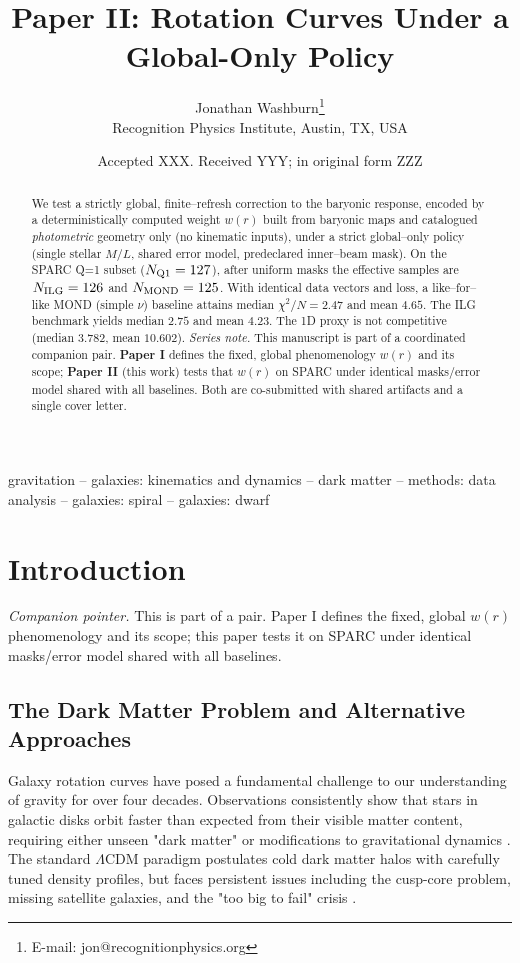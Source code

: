 \documentclass[usenatbib]{mnras}
\title[Rotation Curves Under a Global-Only Policy]{Paper II: Rotation Curves Under a Global-Only Policy}
\author[J. Washburn]{Jonathan Washburn\thanks{E-mail: jon@recognitionphysics.org}\\
Recognition Physics Institute, Austin, TX, USA
}
\date{Accepted XXX. Received YYY; in original form ZZZ}
\begin{document}
\maketitle

\begin{abstract}
We test a strictly global, finite–refresh correction to the baryonic response, encoded by a deterministically computed weight $w(r)$ built from baryonic maps and catalogued \emph{photometric} geometry only (no kinematic inputs), under a strict global–only policy (single stellar $M/L$, shared error model, predeclared inner–beam mask). On the SPARC Q=1 subset ($N_{\rm Q1}=127$), after uniform masks the effective samples are $N_{\rm ILG}=126$ and $N_{\rm MOND}=125$. With identical data vectors and loss, a like–for–like MOND (simple $\nu$) baseline attains median $\chi^2/N=\mathbf{2.47}$ and mean $\mathbf{4.65}$. The ILG benchmark yields median $\mathbf{2.75}$ and mean $\mathbf{4.23}$. The 1D proxy is not competitive (median $\mathbf{3.782}$, mean $\mathbf{10.602}$).
\vspace{0.5em}
\noindent\textit{Series note.} This manuscript is part of a coordinated companion pair. \textbf{Paper I} defines the fixed, global phenomenology $w(r)$ and its scope; \textbf{Paper II} (this work) tests that $w(r)$ on SPARC under identical masks/error model shared with all baselines. Both are co-submitted with shared artifacts and a single cover letter.
\end{abstract}

\begin{keywords}
gravitation -- galaxies: kinematics and dynamics -- dark matter -- methods: data analysis -- galaxies: spiral -- galaxies: dwarf
\end{keywords}

\section{Introduction}
\noindent\textit{Companion pointer.} This is part of a pair. Paper I defines the fixed, global $w(r)$ phenomenology and its scope; this paper tests it on SPARC under identical masks/error model shared with all baselines.

\subsection{The Dark Matter Problem and Alternative Approaches}

Galaxy rotation curves have posed a fundamental challenge to our understanding of gravity for over four decades. Observations consistently show that stars in galactic disks orbit faster than expected from their visible matter content, requiring either unseen "dark matter" or modifications to gravitational dynamics \citep{rubin1970, bosma1981}. The standard $\Lambda$CDM paradigm postulates cold dark matter halos with carefully tuned density profiles, but faces persistent issues including the cusp-core problem, missing satellite galaxies, and the "too big to fail" crisis \citep{bullock2017, boylan2013}.
\end{document}

